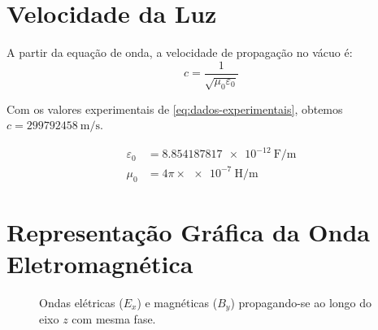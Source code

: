 \section{Velocidade da Luz}

A partir da equação de onda, a velocidade de propagação no vácuo é:
\[
  c = \frac{1}{\sqrt{\mu_0 \varepsilon_0}}
\]

Com os valores experimentais de \eqref{eq:dados-experimentais}, obtemos \( c = \qty{299792458}{\meter\per\second} \).

\begin{equation} \label{eq:dados-experimentais}
    \begin{split}
        \varepsilon_0 &= \qty{8.854187817e-12}{\farad\per\meter} \\
        \mu_0 &= 4\pi \times \qty{e-7}{\henry\per\meter}
    \end{split}
\end{equation}


\section{Representação Gráfica da Onda Eletromagnética}

\begin{figure}[h]
  \centering
  \caption{Ondas elétricas ($E_x$) e magnéticas ($B_y$) propagando-se ao longo do eixo $z$ com mesma fase.}
  \label{fig:onda_em}
\end{figure}
